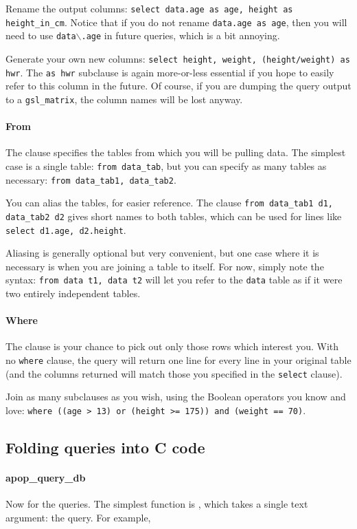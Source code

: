 Rename the output columns: {\tt select data.age as age, height as
height\_in\_cm}. Notice that if you do not rename {\tt data.age as 
age}, then you will need to use {\tt data$\backslash$.age} in future
queries, which is a
bit annoying.

Generate your own new columns: {\tt select height, weight, (height/weight)
as hwr}. The {\tt as hwr} subclause is again more-or-less
essential if you hope to easily refer to this column in the future. Of
course, if you are dumping the query output to a {\tt gsl\_matrix}, the column
names will be lost anyway.

\paragraph{From} The  clause specifies the tables from which
you will be pulling data. The simplest case is a single table: {\tt from
data\_tab}, but you can specify as many tables as necessary: {\tt from
data\_tab1, data\_tab2}. 

You can alias the tables, for easier reference. The clause {\tt from
data\_tab1 d1, data\_tab2 d2} gives short names to both tables, which can
be used for lines like {\tt select d1.age, d2.height}. 

Aliasing is generally optional but very convenient, but one case where
it is necessary is when you are joining a table to itself.
For now, simply note the syntax: {\tt from data t1, data t2} will let
you refer to the {\tt data} table as if it were two entirely independent
tables. 

\paragraph{Where}
The  clause is your chance to pick out only those rows which
interest you. With no {\tt where} clause, the query will return one line
for every line in your original table (and the columns returned will
match those you specified in the {\tt select} clause).

Join as many subclauses as you wish, using the Boolean operators you
know and love: {\tt where ((age > 13) or (height >= 175)) and (weight == 70)}.

\subsection{Folding queries into C code} 


\paragraph{apop\_query\_db} Now for the queries. The simplest function
is , which takes a single text argument: the
query. For example,

